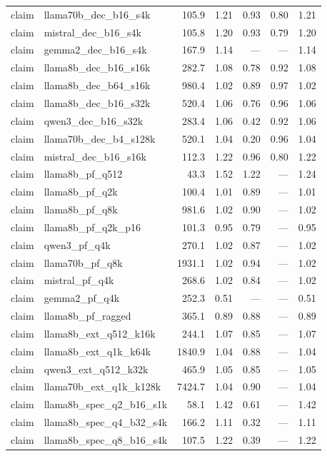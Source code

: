 \begin{longtable}{@{}llrrrrr@{}}
claim & llama70b\_dec\_b16\_s4k & 105.9 & 1.21 & 0.93 & 0.80 & 1.21 \\
claim & mistral\_dec\_b16\_s4k & 105.8 & 1.20 & 0.93 & 0.79 & 1.20 \\
claim & gemma2\_dec\_b16\_s4k & 167.9 & 1.14 & --- & --- & 1.14 \\
claim & llama8b\_dec\_b16\_s16k & 282.7 & 1.08 & 0.78 & 0.92 & 1.08 \\
claim & llama8b\_dec\_b64\_s16k & 980.4 & 1.02 & 0.89 & 0.97 & 1.02 \\
claim & llama8b\_dec\_b16\_s32k & 520.4 & 1.06 & 0.76 & 0.96 & 1.06 \\
claim & qwen3\_dec\_b16\_s32k & 283.4 & 1.06 & 0.42 & 0.92 & 1.06 \\
claim & llama70b\_dec\_b4\_s128k & 520.1 & 1.04 & 0.20 & 0.96 & 1.04 \\
claim & mistral\_dec\_b16\_s16k & 112.3 & 1.22 & 0.96 & 0.80 & 1.22 \\
claim & llama8b\_pf\_q512 & 43.3 & 1.52 & 1.22 & --- & 1.24 \\
claim & llama8b\_pf\_q2k & 100.4 & 1.01 & 0.89 & --- & 1.01 \\
claim & llama8b\_pf\_q8k & 981.6 & 1.02 & 0.90 & --- & 1.02 \\
claim & llama8b\_pf\_q2k\_p16 & 101.3 & 0.95 & 0.79 & --- & 0.95 \\
claim & qwen3\_pf\_q4k & 270.1 & 1.02 & 0.87 & --- & 1.02 \\
claim & llama70b\_pf\_q8k & 1931.1 & 1.02 & 0.94 & --- & 1.02 \\
claim & mistral\_pf\_q4k & 268.6 & 1.02 & 0.84 & --- & 1.02 \\
claim & gemma2\_pf\_q4k & 252.3 & 0.51 & --- & --- & 0.51 \\
claim & llama8b\_pf\_ragged & 365.1 & 0.89 & 0.88 & --- & 0.89 \\
claim & llama8b\_ext\_q512\_k16k & 244.1 & 1.07 & 0.85 & --- & 1.07 \\
claim & llama8b\_ext\_q1k\_k64k & 1840.9 & 1.04 & 0.88 & --- & 1.04 \\
claim & qwen3\_ext\_q512\_k32k & 465.9 & 1.05 & 0.85 & --- & 1.05 \\
claim & llama70b\_ext\_q1k\_k128k & 7424.7 & 1.04 & 0.90 & --- & 1.04 \\
claim & llama8b\_spec\_q2\_b16\_s1k & 58.1 & 1.42 & 0.61 & --- & 1.42 \\
claim & llama8b\_spec\_q4\_b32\_s4k & 166.2 & 1.11 & 0.32 & --- & 1.11 \\
claim & llama8b\_spec\_q8\_b16\_s4k & 107.5 & 1.22 & 0.39 & --- & 1.22 \\

\end{longtable}
